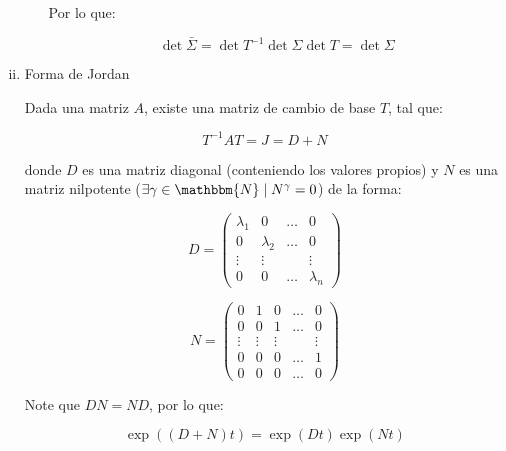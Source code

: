 \begin{enumerate}[i)]
\begin{enumerate}[a)]
                Por lo que:

                \begin{equation}
                    \det{\bar{\Sigma}} = \det{T^{-1}} \det{\Sigma} \det{T} = \det{\Sigma} \nonumber
                \end{equation}

            \end{enumerate}

            \item Forma de Jordan

            Dada una matriz $A$, existe una matriz de cambio de base $T$, tal que:

            \begin{equation}
                T^{-1} A T = J = D + N
            \end{equation}

            donde $D$ es una matriz diagonal (conteniendo los valores propios) y $N$ es una matriz nilpotente ($\exists \gamma \in \mathbbm{N} \mid N^{\gamma} = 0$) de la forma:

            \begin{equation}
                D =
                \begin{pmatrix}
                \lambda_1 & 0 & \dots & 0 \\
                0 & \lambda_2 & \dots & 0 \\
                \vdots & \vdots & & \vdots \\
                0 & 0 & \dots & \lambda_n
                \end{pmatrix} \nonumber
            \end{equation}

            \begin{equation}
                N =
                \begin{pmatrix}
                0 & 1 & 0 & \dots & 0 \\
                0 & 0 & 1 & \dots & 0 \\
                \vdots & \vdots & \vdots & & \vdots \\
                0 & 0 & 0 & \dots & 1 \\
                0 & 0 & 0 & \dots & 0
                \end{pmatrix} \nonumber
            \end{equation}

            Note que $D N = N D$, por lo que:

            \begin{equation}
                \exp{((D + N) t)} = \exp{(D t)} \exp{(N t)}
            \end{equation}


\end{enumerate}
